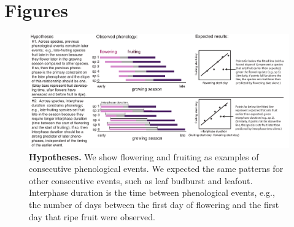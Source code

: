 \documentclass{article}
\begin{document}
\section* {Figures}
\begin{figure}[p]
 \centering
 \includegraphics{../analyses/figures/hypotheses3.pdf} 
 
 \caption{\textbf{Hypotheses.} We show flowering and fruiting as examples of consecutive phenological events. We expected the same patterns for other consecutive events, such as leaf budburst and leafout. Interphase duration is the time between phenological events, e.g., the number of days between the first day of flowering and the first day that ripe fruit were observed.} 
 \label{fig:hyp}
\end{figure}
 
\end{document}
